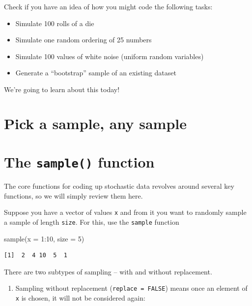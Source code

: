 \documentclass[
  letterpaper,
]{book}
\newenvironment{Shaded}{\begin{snugshade}}{\end{snugshade}}
\newcommand{\AttributeTok}[1]{\textcolor[rgb]{0.40,0.45,0.13}{#1}}
\newcommand{\DecValTok}[1]{\textcolor[rgb]{0.68,0.00,0.00}{#1}}
\newcommand{\FunctionTok}[1]{\textcolor[rgb]{0.28,0.35,0.67}{#1}}
\newcommand{\NormalTok}[1]{\textcolor[rgb]{0.00,0.23,0.31}{#1}}
\newcommand{\SpecialCharTok}[1]{\textcolor[rgb]{0.37,0.37,0.37}{#1}}
\providecommand{\tightlist}{%
  \setlength{\itemsep}{0pt}\setlength{\parskip}{0pt}}\usepackage{longtable,booktabs,array}
\theoremstyle{definition}
\theoremstyle{definition}
\theoremstyle{plain}
\theoremstyle{definition}
\theoremstyle{plain}
\theoremstyle{plain}
\theoremstyle{remark}
\begin{document}
Check if you have an idea of how you might code the following tasks:

\begin{itemize}
\tightlist
\item
  Simulate 100 rolls of a die
\item
  Simulate one random ordering of 25 numbers
\item
  Simulate 100 values of white noise (uniform random variables)
\item
  Generate a ``bootstrap'' sample of an existing dataset
\end{itemize}

We're going to learn about this today!

\hypertarget{pick-a-sample-any-sample}{%
\section{Pick a sample, any sample}\label{pick-a-sample-any-sample}}

\hypertarget{the-sample-function}{%
\section{\texorpdfstring{The \texttt{sample()}
function}{The sample() function}}\label{the-sample-function}}

The core functions for coding up stochastic data revolves around several
key functions, so we will simply review them here.

Suppose you have a vector of values \texttt{x} and from it you want to
randomly sample a sample of length \texttt{size}. For this, use the
\texttt{sample} function

\begin{Shaded}
\begin{Highlighting}[]
\FunctionTok{sample}\NormalTok{(}\AttributeTok{x =} \DecValTok{1}\SpecialCharTok{:}\DecValTok{10}\NormalTok{, }\AttributeTok{size =} \DecValTok{5}\NormalTok{)}
\end{Highlighting}
\end{Shaded}

\begin{verbatim}
[1]  2  4 10  5  1
\end{verbatim}

There are two subtypes of sampling -- with and without replacement.

\begin{enumerate}
\def\labelenumi{\arabic{enumi}.}
\tightlist
\item
  Sampling without replacement (\texttt{replace\ =\ FALSE}) means once
  an element of \texttt{x} is chosen, it will not be considered again:
\end{enumerate}
\end{document}
